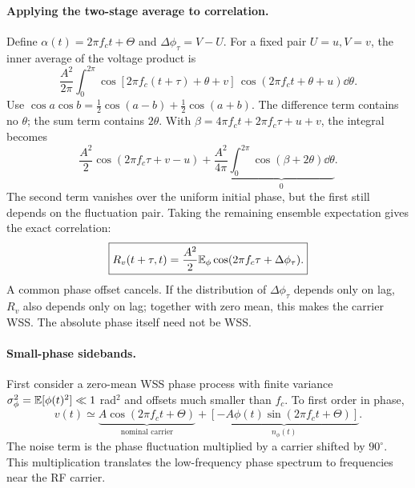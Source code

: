 \paragraph{Applying the two-stage average to correlation.}
Define $\alpha(t)=2\pi f_ct+\Theta$ and $\Delta\phi_\tau=V-U$. For a fixed pair $U=u,V=v$, the inner average of the voltage product is
\[
\frac{A^2}{2\pi}\int_0^{2\pi}
\cos[2\pi f_c(t+\tau)+\theta+v]\,
\cos(2\pi f_ct+\theta+u)\dd\theta.
\]
Use $\cos a\cos b=\tfrac12\cos(a-b)+\tfrac12\cos(a+b)$. The difference term contains no $\theta$; the sum term contains $2\theta$. With $\beta=4\pi f_ct+2\pi f_c\tau+u+v$, the integral becomes
\[
\frac{A^2}{2}\cos(2\pi f_c\tau+v-u)
+\frac{A^2}{4\pi}\underbrace{\int_0^{2\pi}\cos(\beta+2\theta)\dd\theta}_{0}.
\]
The second term vanishes over the uniform initial phase, but the first still depends on the fluctuation pair. Taking the remaining ensemble expectation gives the exact correlation:
\[
\boxed{R_v(t+\tau,t)=\frac{A^2}{2}
\mathbb E_\phi\cos(2\pi f_c\tau+\Delta\phi_\tau).}
\]
A common phase offset cancels. If the distribution of $\Delta\phi_\tau$ depends only on lag, $R_v$ also depends only on lag; together with zero mean, this makes the carrier WSS. The absolute phase itself need not be WSS.

\paragraph{Small-phase sidebands.}
First consider a zero-mean WSS phase process with finite variance
$\sigma_\phi^2=\mathbb E[\phi(t)^2]\ll1$ rad$^2$ and offsets much smaller than $f_c$. To first order in phase,
\[
v(t)\simeq
\underbrace{A\cos(2\pi f_ct+\Theta)}_{\text{nominal carrier}}
+\underbrace{[-A\phi(t)\sin(2\pi f_ct+\Theta)]}_{n_\phi(t)}.
\]
The noise term is the phase fluctuation multiplied by a carrier shifted by $90^\circ$. This multiplication translates the low-frequency phase spectrum to frequencies near the RF carrier.

